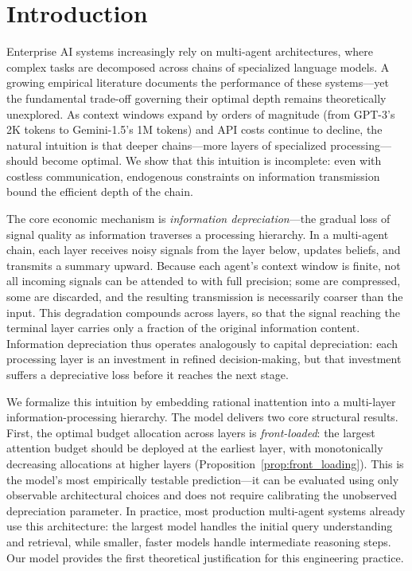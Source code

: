 \section{Introduction}
\label{sec:intro}

Enterprise AI systems increasingly rely on multi-agent architectures, where complex tasks are decomposed across chains of specialized language models. A growing empirical literature documents the performance of these systems---yet the fundamental trade-off governing their optimal depth remains theoretically unexplored. As context windows expand by orders of magnitude (from GPT-3's 2K tokens to Gemini-1.5's 1M tokens) and API costs continue to decline, the natural intuition is that deeper chains---more layers of specialized processing---should become optimal. We show that this intuition is incomplete: even with costless communication, endogenous constraints on information transmission bound the efficient depth of the chain.

The core economic mechanism is \emph{information depreciation}---the gradual loss of signal quality as information traverses a processing hierarchy. In a multi-agent chain, each layer receives noisy signals from the layer below, updates beliefs, and transmits a summary upward. Because each agent's context window is finite, not all incoming signals can be attended to with full precision; some are compressed, some are discarded, and the resulting transmission is necessarily coarser than the input. This degradation compounds across layers, so that the signal reaching the terminal layer carries only a fraction of the original information content. Information depreciation thus operates analogously to capital depreciation: each processing layer is an investment in refined decision-making, but that investment suffers a depreciative loss before it reaches the next stage.

We formalize this intuition by embedding rational inattention \citep{sims2003implications} into a multi-layer information-processing hierarchy. The model delivers two core structural results. First, the optimal budget allocation across layers is \emph{front-loaded}: the largest attention budget should be deployed at the earliest layer, with monotonically decreasing allocations at higher layers (Proposition~\ref{prop:front_loading}). This is the model's most empirically testable prediction---it can be evaluated using only observable architectural choices and does not require calibrating the unobserved depreciation parameter. In practice, most production multi-agent systems already use this architecture: the largest model handles the initial query understanding and retrieval, while smaller, faster models handle intermediate reasoning steps. Our model provides the first theoretical justification for this engineering practice.

